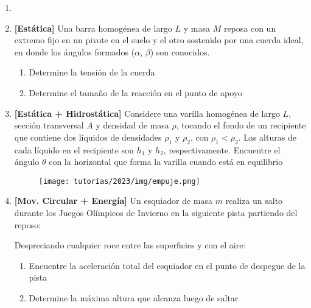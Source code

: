 \documentclass[letterpaper,11pt]{article}
\begin{document}
\vspace{-1cm}
\begin{enumerate}\setlength{\itemsep}{0.4cm}

\item[]

\item \textbf{[Estática]} Una barra homogénea de largo $L$ y masa $M$ reposa con un extremo fijo en un pivote en el suelo y el otro sostenido por una cuerda ideal, en donde los ángulos formados ($\alpha$, $\beta$) son conocidos.
    \begin{enumerate}
        \item Determine la tensión de la cuerda
        
        \item Determine el tamaño de la reacción en el punto de apoyo
    \end{enumerate}

    \begin{figure}[h!]
      \centering
      
    \end{figure}

\item \textbf{[Estática + Hidrostática]} Considere una varilla homogénea de largo $L$, sección transversal $A$ y densidad de masa $\rho$, tocando el fondo de un recipiente que contiene dos líquidos de densidades $\rho_1$ y $\rho_2$, con $\rho_1 < \rho_2$. Las alturas de cada líquido en el recipiente son $h_1$ y $h_2$, respectivamente.
Encuentre el ángulo $\theta$ con la horizontal que forma la varilla cuando está en equilibrio

\begin{figure}[H]
    \centering
    \texttt{[image: tutorías/2023/img/empuje.png]}
\end{figure}

\item \textbf{[Mov. Circular + Energía]}  Un esquiador de masa $m$ realiza un salto durante los Juegos Olímpicos de Invierno en la siguiente pista partiendo del reposo:
\begin{multicols}{2}
Despreciando cualquier roce entre las superficies y con el aire:

\begin{enumerate}
    \item Encuentre la aceleración total del esquiador en el punto de despegue de la pista

    \item Determine la máxima altura que alcanza luego de saltar
\end{enumerate}


\end{multicols}
\end{enumerate}
\end{document}
